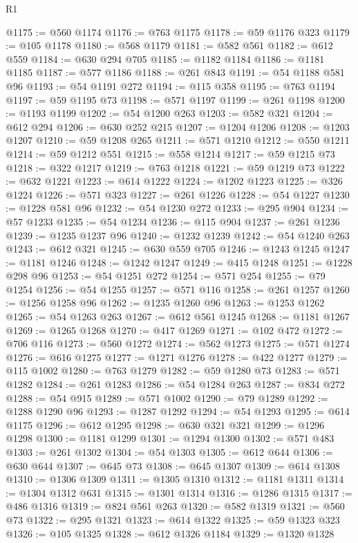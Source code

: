\begin{lexlean}{R1}
\begin{coremodule}
@1175 := @560 @1174
@1176 := @763 @1175
@1178 := @59 @1176 @323
@1179 := @105 @1178
@1180 := @568 @1179
@1181 := @582 @561
@1182 := @612 @559
@1184 := @630 @294 @705
@1185 := @1182 @1184
@1186 := @1181 @1185
@1187 := @577 @1186
@1188 := @261 @843
@1191 := @54 @1188 @581 @96
@1193 := @54 @1191 @272
@1194 := @115 @358
@1195 := @763 @1194
@1197 := @59 @1195 @73
@1198 := @571 @1197
@1199 := @261 @1198
@1200 := @1193 @1199
@1202 := @54 @1200 @263
@1203 := @582 @321
@1204 := @612 @294
@1206 := @630 @252 @215
@1207 := @1204 @1206
@1208 := @1203 @1207
@1210 := @59 @1208 @265
@1211 := @571 @1210
@1212 := @550 @1211
@1214 := @59 @1212 @551
@1215 := @558 @1214
@1217 := @59 @1215 @73
@1218 := @322 @1217
@1219 := @763 @1218
@1221 := @59 @1219 @73
@1222 := @632 @1221
@1223 := @614 @1222
@1224 := @1202 @1223
@1225 := @326 @1224
@1226 := @571 @323
@1227 := @261 @1226
@1228 := @54 @1227
@1230 := @1228 @581 @96
@1232 := @54 @1230 @272
@1233 := @295 @904
@1234 := @57 @1233
@1235 := @54 @1234
@1236 := @115 @904
@1237 := @261 @1236
@1239 := @1235 @1237 @96
@1240 := @1232 @1239
@1242 := @54 @1240 @263
@1243 := @612 @321
@1245 := @630 @559 @705
@1246 := @1243 @1245
@1247 := @1181 @1246
@1248 := @1242 @1247
@1249 := @415 @1248
@1251 := @1228 @298 @96
@1253 := @54 @1251 @272
@1254 := @571 @254
@1255 := @79 @1254
@1256 := @54 @1255
@1257 := @571 @116
@1258 := @261 @1257
@1260 := @1256 @1258 @96
@1262 := @1235 @1260 @96
@1263 := @1253 @1262
@1265 := @54 @1263 @263
@1267 := @612 @561 @1245
@1268 := @1181 @1267
@1269 := @1265 @1268
@1270 := @417 @1269
@1271 := @102 @472
@1272 := @706 @116
@1273 := @560 @1272
@1274 := @562 @1273
@1275 := @571 @1274
@1276 := @616 @1275
@1277 := @1271 @1276
@1278 := @422 @1277
@1279 := @115 @1002
@1280 := @763 @1279
@1282 := @59 @1280 @73
@1283 := @571 @1282
@1284 := @261 @1283
@1286 := @54 @1284 @263
@1287 := @834 @272
@1288 := @54 @915
@1289 := @571 @1002
@1290 := @79 @1289
@1292 := @1288 @1290 @96
@1293 := @1287 @1292
@1294 := @54 @1293
@1295 := @614 @1175
@1296 := @612 @1295
@1298 := @630 @321 @321
@1299 := @1296 @1298
@1300 := @1181 @1299
@1301 := @1294 @1300
@1302 := @571 @483
@1303 := @261 @1302
@1304 := @54 @1303
@1305 := @612 @644
@1306 := @630 @644
@1307 := @645 @73
@1308 := @645 @1307
@1309 := @614 @1308
@1310 := @1306 @1309
@1311 := @1305 @1310
@1312 := @1181 @1311
@1314 := @1304 @1312 @631
@1315 := @1301 @1314
@1316 := @1286 @1315
@1317 := @486 @1316
@1319 := @824 @561 @263
@1320 := @582 @1319
@1321 := @560 @73
@1322 := @295 @1321
@1323 := @614 @1322
@1325 := @59 @1323 @323
@1326 := @105 @1325
@1328 := @612 @1326 @1184
@1329 := @1320 @1328

\end{coremodule}
\end{lexlean}
